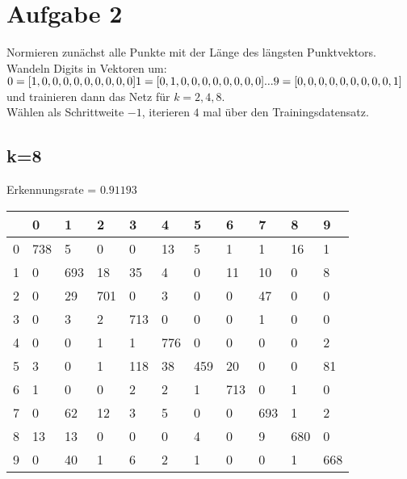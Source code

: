 \documentclass[a4paper,10pt]{article}
\begin{document}
 \section*{Aufgabe 2}
 	Normieren zunächst alle Punkte mit der
 	Länge des längsten Punktvektors.
 	\\
 	Wandeln Digits in Vektoren um:\\ $0 = [1,0,0,0,0,0,0,0,0,0]\\1 = [0,1,0,0,0,0,0,0,0,0]\\...\\9 = [0,0,0,0,0,0,0,0,0,1]$\\
	und trainieren dann das Netz für $k = 2,4,8$.\\
	Wählen als Schrittweite $-1$, iterieren $4$ mal über den Trainingsdatensatz.
	\subsection*{k=8}
		Erkennungsrate = $0.91193$\\
		\begin{tabular}{||l|l|l|l|l|l|l|l|l|l|l|}
		 \hline 
			& 0 & 1 & 2 & 3 & 4 & 5 & 6 & 7 & 8 & 9 \\ \hline \hline
			0 & 738   &  5  &   0  &   0 &   13    & 5 &    1  &   1&    16 &     1\\ \hline
			1 &0&   693  &  18 &   35  &   4   &  0  &  11  &  10 &    0 &    8\\ \hline
			2 &0 &   29  & 701   &  0 &    3  &   0   &  0 &   47   &  0 &    0\\ \hline
			3 &0   &   3 &     2&    713 &     0&      0 &     0&      1 &     0 &     0\\ \hline
			4 &0    & 0&     1   &  1&   776  &   0  &   0   &  0   &  0    & 2\\ \hline
			5 &3 &    0  &   1 &  118 &   38 &  459 &   20 &    0 &    0  &  81\\ \hline
			6 &  1  &   0  &   0 &    2 &    2 &    1  & 713  &   0  &   1  &   0\\ \hline
			7 &0  &  62 &   12   &  3 &    5  &   0 &    0  & 693 &    1  &   2\\ \hline
			8 &13   &  13  &    0  &    0  &    0   &   4  &    0  &    9  &  680 &     0\\ \hline
			9 & 0&   40 &    1     & 6 &    2  &   1 &    0 &    0 &    1 &  668\\ \hline
		\end{tabular}
		
\end{document}
